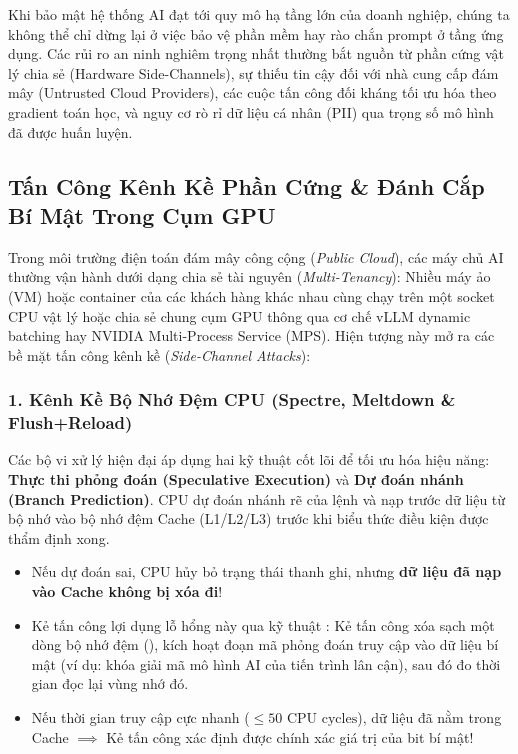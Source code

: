 Khi bảo mật hệ thống AI đạt tới quy mô hạ tầng lớn của doanh nghiệp, chúng ta không thể chỉ dừng lại ở việc bảo vệ phần mềm hay rào chắn prompt ở tầng ứng dụng. Các rủi ro an ninh nghiêm trọng nhất thường bắt nguồn từ phần cứng vật lý chia sẻ (Hardware Side-Channels), sự thiếu tin cậy đối với nhà cung cấp đám mây (Untrusted Cloud Providers), các cuộc tấn công đối kháng tối ưu hóa theo gradient toán học, và nguy cơ rò rỉ dữ liệu cá nhân (PII) qua trọng số mô hình đã được huấn luyện.

\subsection{Tấn Công Kênh Kề Phần Cứng \& Đánh Cắp Bí Mật Trong Cụm GPU}
\label{subsec:hardware-side-channels}
Trong môi trường điện toán đám mây công cộng (\textit{Public Cloud}), các máy chủ AI thường vận hành dưới dạng chia sẻ tài nguyên (\textit{Multi-Tenancy}): Nhiều máy ảo (VM) hoặc container của các khách hàng khác nhau cùng chạy trên một socket CPU vật lý hoặc chia sẻ chung cụm GPU thông qua cơ chế vLLM dynamic batching hay NVIDIA Multi-Process Service (MPS). Hiện tượng này mở ra các bề mặt tấn công kênh kề (\textit{Side-Channel Attacks}):

\subsubsection{1. Kênh Kề Bộ Nhớ Đệm CPU (Spectre, Meltdown \& Flush+Reload)}
Các bộ vi xử lý hiện đại áp dụng hai kỹ thuật cốt lõi để tối ưu hóa hiệu năng: \textbf{Thực thi phỏng đoán (Speculative Execution)} và \textbf{Dự đoán nhánh (Branch Prediction)}. CPU dự đoán nhánh rẽ của lệnh  và nạp trước dữ liệu từ bộ nhớ vào bộ nhớ đệm Cache (L1/L2/L3) trước khi biểu thức điều kiện được thẩm định xong.
\begin{itemize}
  \item Nếu dự đoán sai, CPU hủy bỏ trạng thái thanh ghi, nhưng \textbf{dữ liệu đã nạp vào Cache không bị xóa đi}!
  \item Kẻ tấn công lợi dụng lỗ hổng này qua kỹ thuật : Kẻ tấn công xóa sạch một dòng bộ nhớ đệm (), kích hoạt đoạn mã phỏng đoán truy cập vào dữ liệu bí mật (ví dụ: khóa giải mã mô hình AI của tiến trình lân cận), sau đó đo thời gian đọc lại vùng nhớ đó.
  \item Nếu thời gian truy cập cực nhanh ($\le 50\text{ CPU cycles}$), dữ liệu đã nằm trong Cache $\implies$ Kẻ tấn công xác định được chính xác giá trị của bit bí mật!
\end{itemize}

